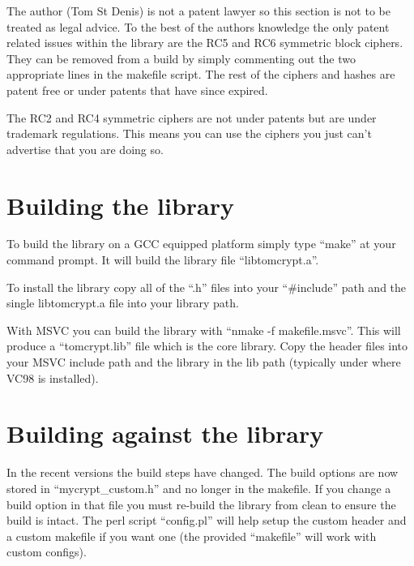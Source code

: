 \documentclass{book}
\begin{document}
The author (Tom St Denis) is not a patent lawyer so this section is not to be treated as legal advice.  To the best
of the authors knowledge the only patent related issues within the library are the RC5 and RC6 symmetric block ciphers.  
They can be removed from a build by simply commenting out the two appropriate lines in the makefile script.  The rest
of the ciphers and hashes are patent free or under patents that have since expired.

The RC2 and RC4 symmetric ciphers are not under patents but are under trademark regulations.  This means you can use 
the ciphers you just can't advertise that you are doing so.  

\section{Building the library}

To build the library on a GCC equipped platform simply type ``make'' at your command prompt.  It will build the library
file ``libtomcrypt.a''.  

To install the library copy all of the ``.h'' files into your ``\#include'' path and the single libtomcrypt.a file into 
your library path.

With MSVC you can build the library with ``nmake -f makefile.msvc''.  This will produce a ``tomcrypt.lib'' file which
is the core library.  Copy the header files into your MSVC include path and the library in the lib path (typically
under where VC98 is installed).

\section{Building against the library}

In the recent versions the build steps have changed.  The build options are now stored in ``mycrypt\_custom.h'' and
no longer in the makefile.  If you change a build option in that file you must re-build the library from clean to
ensure the build is intact.  The perl script ``config.pl'' will help setup the custom header and a custom makefile
if you want one (the provided ``makefile'' will work with custom configs).
\end{document}

